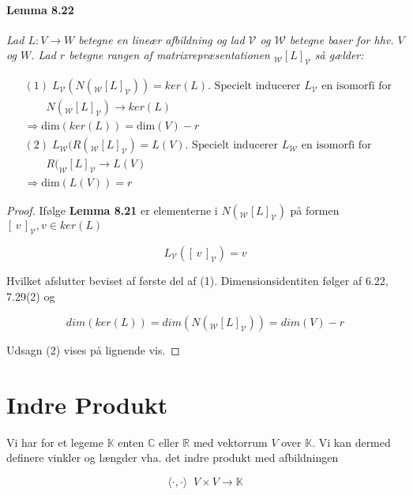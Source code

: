 \documentclass[paper=a4, fontsize=11pt]{scrartcl} %
\begin{document}
	\paragraph{Lemma 8.22} \textit{Lad $L: V \rightarrow W$ betegne en lineær afbildning og lad $\mathcal{V}$ og $\mathcal{W}$ betegne baser for hhv. $V$ og $W$. Lad $r$ betegne rangen af matrixrepræsentationen $_{\mathcal{W}}[L]_{\mathcal{V}}$ så gælder:}
	
	
	\begin{align*}
		&(1) \; L_{\mathcal{V}}(N(_{\mathcal{W}}[L]_{\mathcal{V}})) = ker(L). \text{ Specielt inducerer $L_{\mathcal{V}}$ en isomorfi for } \\
		& \qquad N(_{\mathcal{W}}[L]_{\mathcal{V}}) \rightarrow ker(L)\\
		& \Rightarrow \mbox{dim}(ker(L)) = \mbox{dim}(V) - r\\
		&(2) \; L_{\mathcal{W}}(R(_{\mathcal{W}}[L]_{\mathcal{V}}) = L(V). \text{ Specielt inducerer $L_{\mathcal{W}}$ en isomorfi for } \\
		& \qquad R(_{\mathcal{W}}[L]_{\mathcal{V}} \rightarrow L(V)\\
		& \Rightarrow \mbox{dim}(L(V)) = r
	\end{align*}
	\begin{proof}
		
		Ifølge \textbf{Lemma 8.21} er elementerne i $N(_{\mathcal{W}}[L]_{\mathcal{V}})$ på formen $[\,v\,]_{\mathcal{V}}, v \in ker(L)$
		
		\[L_{\mathcal{V}}([\,v\,]_{\mathcal{V}}) = v\]
		
		Hvilket afslutter beviset af første del af (1). Dimensionsidentiten følger af 6.22, 7.29(2) og
		
		\[dim(ker(L)) = dim(N(_{\mathcal{W}}[L]_{\mathcal{V}})) = dim(V) - r\]
		
		Udsagn (2) vises på lignende vis.
	\end{proof}
	\newpage
	
	\section{Indre Produkt}
	
	
	Vi har for et legeme $\mathbb{K}$ enten $\mathbb{C}$ eller $\mathbb{R}$ med vektorrum $V$ over $\mathbb{K}$. Vi kan dermed definere vinkler og længder vha. det indre produkt med afbildningen
	
	\[\langle \cdot , \cdot \rangle \; \; V \times V \rightarrow \mathbb{K}\]
	
\end{document}
